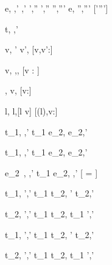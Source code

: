    {e,\hat{\sigma} \hat{\eval} ,\hat{\sigma}'  \Quad
     ,\hat{\sigma}' \hat{\stride} ',\hat{\sigma}''  \Quad
     ',\hat{\sigma}'' \hat{\normalise} '',\hat{\sigma}'''}
    {e,\hat{\sigma} \hat{\normalise} '',\hat{\sigma}'''}
    [\hat{\sigma}'\neq \hat{\sigma}''\vee {}\neq {}']




  {t,\hat{\sigma}  ,\hat{\sigma}'}


  { }
  {\Edit v,\hat{\sigma} ' \Edit v',\hat{\sigma}}
  [v,v':\tau]

  { }
  {\Edit v,\sigma \handle{\Empty} \Enter \tau,\sigma,\True}
  [v : \tau]

  { }
  {\Enter \tau,\hat{\sigma}  \Edit v,\hat{\sigma}}
  [v:\tau]

  { }
  {\Update l,\hat{\sigma}  \Update l,\hat{\sigma}[l \mapsto v]}
  [\hat\sigma(l),v:\tau]

  {t_1,\hat\sigma {} ,\hat\sigma'}
  {t_1 \Then e_2,\hat\sigma {}  \Then e_2,\hat\sigma'}

  {t_1,\hat\sigma {} ,\hat\sigma'}
  {t_1 \Next e_2,\hat\sigma {}  \Next e_2,\hat\sigma'}

  {e_2\ ,\hat\sigma \hat{\normalise} ,\hat{\sigma}'}
  {t_1 \Next e_2,\hat\sigma \xrightarrow[]{\Continue} ,\hat{\sigma}'}
  [ =  \land \neg{}]


  {t_1,\hat\sigma {} ',\hat{\sigma}'}
  {t_1 \And t_2,\hat\sigma {} ' \And t_2,\hat{\sigma}'}

  {t_2,\hat\sigma {} ',\hat{\sigma}'}
  {t_1 \And t_2,\hat\sigma {} t_1 \And {}',\hat{\sigma}'}


  {t_1,\hat\sigma {} ',\hat{\sigma}'}
  {t_1 \Or t_2,\hat\sigma {} ' \Or t_2,\hat{\sigma}'}

  {t_2,\hat\sigma {} ',\hat{\sigma}' }
  {t_1 \Or t_2,\hat\sigma {} t_1 \Or {}',\hat{\sigma}'}


